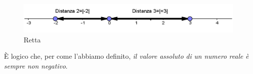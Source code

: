 \begin{figure}[h]
\begin{center}
\begin{inaccessibleblock}[TODO]
\includegraphics[width=0.8\linewidth]{img/imm1} %
\end{inaccessibleblock}
\caption{Retta}
\label{fig:abs_imm1}
\end{center}
\end{figure}

È logico che, per come l'abbiamo definito,\textit{ il valore assoluto di un 
numero reale è sempre non negativo}.

